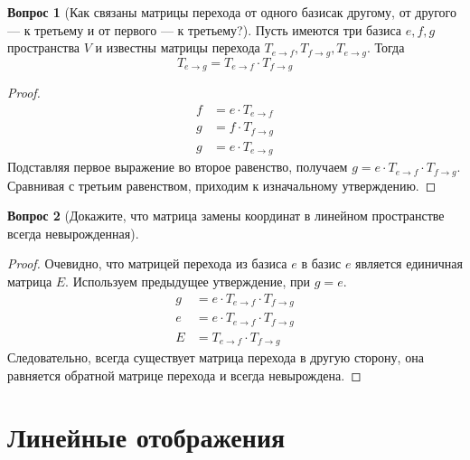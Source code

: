 \documentclass[a4paper,11pt]{article}
\theoremstyle{remark}
\theoremstyle{definition}
\newtheorem{question}{Вопрос}
\numberwithin{question}{subsection}
\begin{document}
\begin{question}[Как связаны матрицы перехода от одного базисак другому, от другого --- к третьему и от первого --- к третьему?]
Пусть имеются три базиса \(e, f, g\) пространства \(V\) и известны матрицы перехода \(T_{e \rightarrow f}, T_{f \rightarrow g}, T_{e \rightarrow g}\). Тогда
\begin{equation*}
	T_{e \rightarrow g} = T_{e \rightarrow f} \cdot T_{f \rightarrow g}
\end{equation*}

\begin{proof}
\begin{align*}
	f &= e \cdot T_{e \rightarrow f} \\
	g &= f \cdot T_{f \rightarrow g} \\
	g &= e \cdot T_{e \rightarrow g}
\end{align*}
Подставляя первое выражение во второе равенство, получаем \(g = e \cdot T_{e \rightarrow f} \cdot T_{f \rightarrow g}\). Сравнивая с третьим равенством, приходим к изначальному утверждению.
\end{proof}
\end{question}


\begin{question}[Докажите, что матрица замены координат в линейном пространстве всегда невырожденная]\(\)
\begin{proof}
Очевидно, что матрицей перехода из базиса \(e\) в базис \(e\) является единичная матрица \(E\). Используем предыдущее утверждение, при \(g = e\).
\begin{align*}
	g &= e \cdot T_{e \rightarrow f} \cdot T_{f \rightarrow g} \\
	e &= e \cdot T_{e \rightarrow f} \cdot T_{f \rightarrow g} \\
	E &= T_{e \rightarrow f} \cdot T_{f \rightarrow g}
\end{align*}
Следовательно, всегда существует матрица перехода в другую сторону, она равняется обратной матрице перехода и всегда невырождена.
\end{proof}
\end{question}



\section{Линейные отображения}
\end{document}
